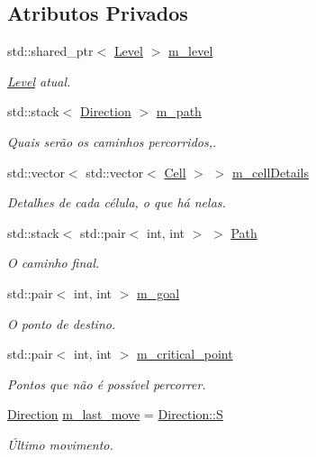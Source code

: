 \subsection*{Atributos Privados}
\begin{DoxyCompactItemize}
\item 
std\+::shared\+\_\+ptr$<$ \hyperlink{classLevel}{Level} $>$ \hyperlink{classAI_af93a09195c1d191c18db701128c57fc3}{m\+\_\+level}
\begin{DoxyCompactList}\small\item\em \hyperlink{classLevel}{Level} atual. \end{DoxyCompactList}\item 
std\+::stack$<$ \hyperlink{game__classes_8hpp_a224b9163917ac32fc95a60d8c1eec3aa}{Direction} $>$ \hyperlink{classAI_a9d3bece93820828040d6193957da4343}{m\+\_\+path}
\begin{DoxyCompactList}\small\item\em Quais serão os caminhos percorridos,. \end{DoxyCompactList}\item 
std\+::vector$<$ std\+::vector$<$ \hyperlink{structCell}{Cell} $>$ $>$ \hyperlink{classAI_a76b2682dd63290bcd1e095acc8d67327}{m\+\_\+cell\+Details}
\begin{DoxyCompactList}\small\item\em Detalhes de cada célula, o que há nelas. \end{DoxyCompactList}\item 
std\+::stack$<$ std\+::pair$<$ int, int $>$ $>$ \hyperlink{classAI_a9756fc935cc86172232373d70b86aa0c}{Path}
\begin{DoxyCompactList}\small\item\em O caminho final. \end{DoxyCompactList}\item 
std\+::pair$<$ int, int $>$ \hyperlink{classAI_a7ba53175395b1ee06740384962980ea3}{m\+\_\+goal}
\begin{DoxyCompactList}\small\item\em O ponto de destino. \end{DoxyCompactList}\item 
std\+::pair$<$ int, int $>$ \hyperlink{classAI_aad8433aa1c9caa89539d64ece68326b7}{m\+\_\+critical\+\_\+point}
\begin{DoxyCompactList}\small\item\em Pontos que não é possível percorrer. \end{DoxyCompactList}\item 
\hyperlink{game__classes_8hpp_a224b9163917ac32fc95a60d8c1eec3aa}{Direction} \hyperlink{classAI_a397965e2d5b40c0081711e6e70cab343}{m\+\_\+last\+\_\+move} = \hyperlink{game__classes_8hpp_a224b9163917ac32fc95a60d8c1eec3aaa5dbc98dcc983a70728bd082d1a47546e}{Direction\+::S}
\begin{DoxyCompactList}\small\item\em Último movimento. \end{DoxyCompactList}\end{DoxyCompactItemize}
